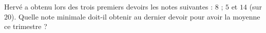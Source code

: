 
\begin{exercice}\label{exo2smath-0290}

Hervé a obtenu lors des trois premiers devoirs les notes suivantes : $8$ ; $5$ et $14$ (sur \( 20\)).  Quelle note minimale doit-il obtenir au dernier devoir pour avoir la moyenne ce trimestre ?

\end{exercice}
